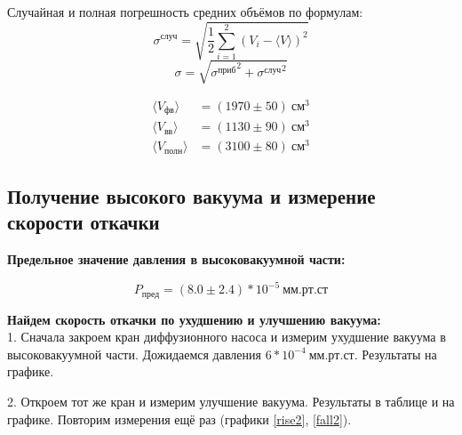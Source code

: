 \documentclass[a4paper, 12pt]{article}
\begin{document}
        Случайная и полная погрешность средних объёмов по формулам:
        $$ \sigma^{случ} = \sqrt{ \frac{1}{2} \sum_{i=1}^{2} (V_i - \langle V \rangle )^2 } $$
        $$ \sigma = \sqrt{{\sigma^{приб}}^2 + {\sigma^{случ}}^2} $$

        \begin{align*}
            \langle V_{фв} \rangle &= (1970 \pm 50)~см^3\\
            \langle V_{вв} \rangle &= (1130 \pm 90)~см^3\\
            \langle V_{полн} \rangle &= (3100 \pm 80)~см^3
        \end{align*}

    \subsection{Получение высокого вакуума и измерение скорости откачки}
        \textbf{Предельное значение давления в высоковакуумной части:}

            $$ P_{пред} = (8.0 \pm 2.4)*10^{-5}~мм.рт.ст $$

        \textbf{Найдем скорость откачки по ухудшению и улучшению вакуума:} \\

            1. Сначала закроем кран диффузионного насоса и измерим ухудшение вакуума в высоковакуумной части. Дожидаемся давления $6*10^{-4}~мм.рт.ст$. Результаты на графике.

            2. Откроем тот же кран и измерим улучшение вакуума. Результаты в таблице и на графике. Повторим измерения ещё раз (графики \ref{rise2}, \ref{fall2}).
\end{document}
